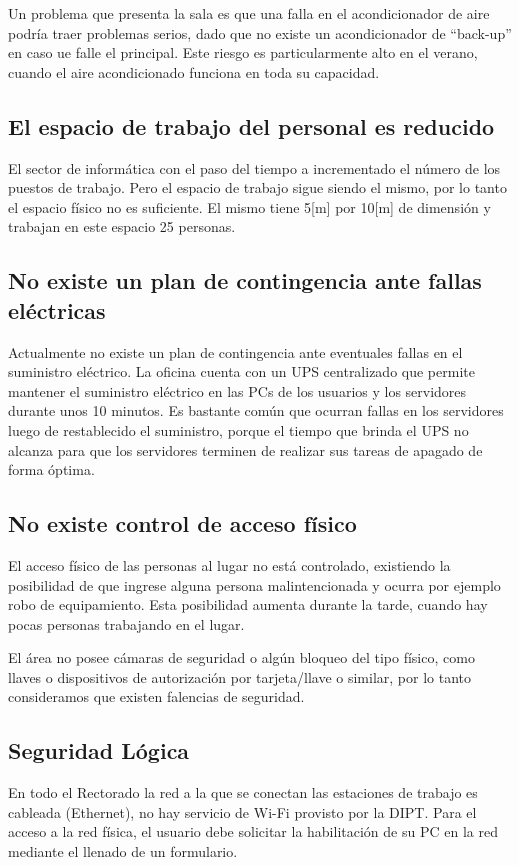 \documentclass[a4paper,11pt,oneside]{article}
\begin{document}
Un problema que presenta la sala es que una falla en el acondicionador
de aire podría traer problemas serios, dado que no existe un
acondicionador de ``back-up'' en caso ue falle el principal. Este
riesgo es particularmente alto en el verano, cuando el aire
acondicionado funciona en toda su capacidad.
%
\subsection*{El espacio de trabajo del personal es reducido}
El sector de informática con el paso del tiempo a incrementado el
número de los puestos de trabajo. Pero el espacio de trabajo sigue
siendo el mismo, por lo tanto el espacio físico no es suficiente. El
mismo tiene 5[m] por 10[m] de dimensión y trabajan en este espacio 25 personas.
%
\subsection*{No existe un plan de contingencia ante fallas eléctricas}
Actualmente no existe un plan de contingencia ante eventuales fallas
en el suministro eléctrico. La oficina cuenta con un UPS centralizado
que permite mantener el suministro eléctrico en las PCs de los
usuarios y los servidores durante unos 10 minutos. Es bastante común
que ocurran fallas en los servidores luego de restablecido el
suministro, porque el tiempo que brinda el UPS no alcanza para que los servidores 
terminen de realizar sus tareas de apagado de forma óptima.
%
\subsection*{No existe control de acceso físico}
El acceso físico de las personas al lugar no está controlado, existiendo la
posibilidad de que ingrese alguna persona malintencionada y ocurra por
ejemplo robo de equipamiento. Esta posibilidad aumenta durante la
tarde, cuando hay pocas personas trabajando en el lugar.

El área no posee cámaras de seguridad o algún bloqueo del tipo físico,
como llaves o dispositivos de autorización por tarjeta/llave o similar,
por lo tanto consideramos que existen falencias de seguridad.
%
\subsection*{Seguridad Lógica}
En todo el Rectorado la red a la que se conectan las estaciones de
trabajo es cableada (Ethernet), no hay servicio de Wi-Fi provisto por
la DIPT. Para el acceso a la red física, el usuario debe solicitar la
habilitación de su PC en la red mediante el llenado de un
formulario.
\end{document}
